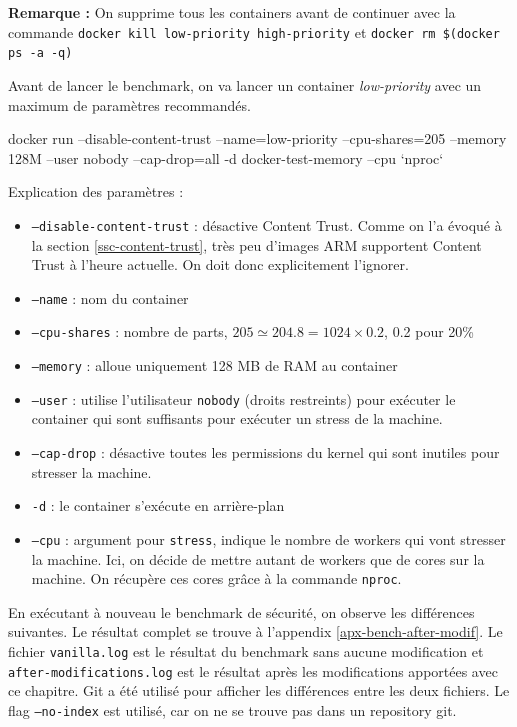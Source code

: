 \documentclass[11pt,a4paper,oneside]{report}
\newcommand{\code}[1]{\texttt{#1}}
\begin{document}
\textbf{Remarque :} On supprime tous les containers avant de continuer avec la commande \code{docker kill low-priority high-priority} et \code{docker rm \$(docker ps -a -q)}

Avant de lancer le benchmark, on va lancer un container \textit{low-priority} avec un maximum de paramètres recommandés.

\begin{textcode}
docker run --disable-content-trust --name=low-priority --cpu-shares=205 --memory 128M --user nobody --cap-drop=all -d docker-test-memory --cpu `nproc`
\end{textcode}

Explication des paramètres :
\begin{itemize}
\item \code{--disable-content-trust} : désactive Content Trust. Comme on l'a évoqué à la section \ref{ssc-content-trust}, très peu d'images ARM supportent Content Trust à l'heure actuelle. On doit donc explicitement l'ignorer.
\item \code{--name} : nom du container
\item \code{--cpu-shares} : nombre de parts, $205 \simeq 204.8 = 1024 \times 0.2$, 0.2 pour 20\%
\item \code{--memory} : alloue uniquement 128 MB de RAM au container
\item \code{--user} : utilise l'utilisateur \code{nobody} (droits restreints) pour exécuter le container qui sont suffisants pour exécuter un stress de la machine.
\item \code{--cap-drop} : désactive toutes les permissions du kernel qui sont inutiles pour stresser la machine.
\item \code{-d} : le container s'exécute en arrière-plan
\item \code{--cpu} : argument pour \code{stress}, indique le nombre de workers qui vont stresser la machine. Ici, on décide de mettre autant de workers que de cores sur la machine. On récupère ces cores grâce à la commande \code{nproc}.
\end{itemize}

En exécutant à nouveau le benchmark de sécurité, on observe les différences suivantes. Le résultat complet se trouve à l'appendix \ref{apx-bench-after-modif}. Le fichier \code{vanilla.log} est le résultat du benchmark sans aucune modification et \code{after-modifications.log} est le résultat après les modifications apportées avec ce chapitre. Git a été utilisé pour afficher les différences entre les deux fichiers. Le flag \code{--no-index} est utilisé, car on ne se trouve pas dans un repository git.
\end{document}
